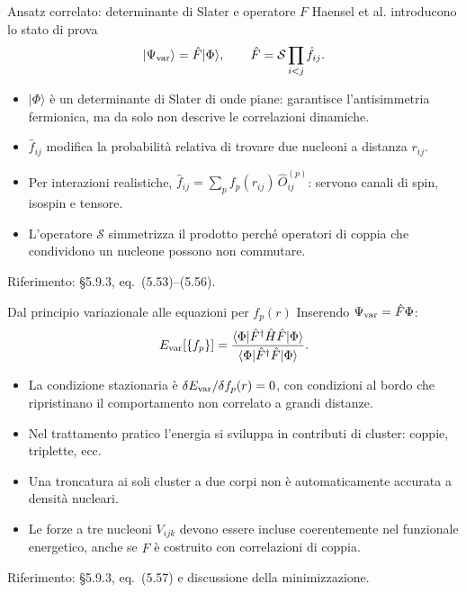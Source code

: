 \begin{frame}[t]{Ansatz correlato: determinante di Slater e operatore $F$}
\small
Haensel et al. introducono lo stato di prova
\[
|\Psi_{\rm var}\rangle=\hat F|\Phi\rangle,\qquad
\hat F=\mathcal S\prod_{i<j}\hat f_{ij}.
\]
\begin{itemize}
\item $|\Phi\rangle$ è un determinante di Slater di onde piane: garantisce l'antisimmetria fermionica, ma da solo non descrive le correlazioni dinamiche.
\item $\hat f_{ij}$ modifica la probabilità relativa di trovare due nucleoni a distanza $r_{ij}$.
\item Per interazioni realistiche, $\hat f_{ij}=\sum_p f_p(r_{ij})\,\hat O_{ij}^{(p)}$: servono canali di spin, isospin e tensore.
\item L'operatore $\mathcal S$ simmetrizza il prodotto perché operatori di coppia che condividono un nucleone possono non commutare.
\end{itemize}
{\footnotesize Riferimento: §5.9.3, eq.~(5.53)--(5.56).}
\end{frame}

\begin{frame}[t]{Dal principio variazionale alle equazioni per $f_p(r)$}
\small
Inserendo $\Psi_{\rm var}=\hat F\Phi$:
\[
E_{\rm var}[\{f_p\}]
=\frac{\langle\Phi|\hat F^\dagger\hat H\hat F|\Phi\rangle}
{\langle\Phi|\hat F^\dagger\hat F|\Phi\rangle}.
\]
\begin{itemize}
\item La condizione stazionaria è $\delta E_{\rm var}/\delta f_p(r)=0$, con condizioni al bordo che ripristinano il comportamento non correlato a grandi distanze.
\item Nel trattamento pratico l'energia si sviluppa in contributi di cluster: coppie, triplette, ecc.
\item Una troncatura ai soli cluster a due corpi non è automaticamente accurata a densità nucleari.
\item Le forze a tre nucleoni $V_{ijk}$ devono essere incluse coerentemente nel funzionale energetico, anche se $\hat F$ è costruito con correlazioni di coppia.
\end{itemize}
{\footnotesize Riferimento: §5.9.3, eq.~(5.57) e discussione della minimizzazione.}
\end{frame}

